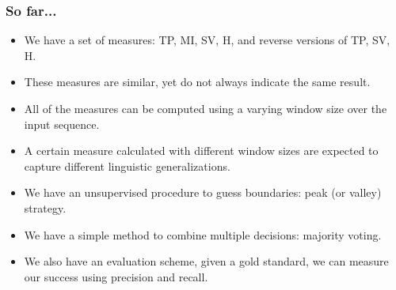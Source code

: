 \begin{frame}
\frametitle{So far...}


\begin{itemize}
\item We have a set of measures: TP, MI, SV, H, and reverse 
      versions of TP, SV, H.
\item These measures are similar, yet do not always indicate the same
      result.
\item All of the measures can be computed using a varying window size
      over the input sequence.
\item A certain measure calculated with different window sizes are
      expected to capture different linguistic generalizations.
\item We have an unsupervised procedure to guess boundaries: 
      peak (or valley) strategy.
\item We have a simple method to combine multiple decisions: majority
      voting.
\item We also have an evaluation scheme, given a gold standard, we can
      measure our success using precision and recall.
\end{itemize}

\end{frame}
